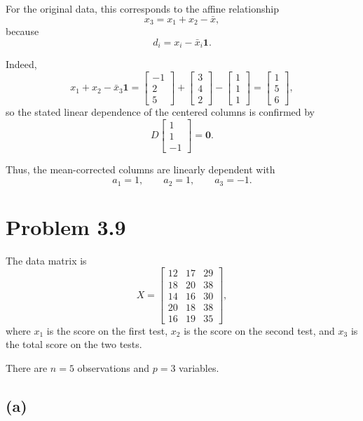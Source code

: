 \documentclass[12pt]{article}
\begin{document}
	For the original data, this corresponds to the affine
	relationship
	\[
	x_3=x_1+x_2-\bar{x},
	\]
	because
	\[
	d_i=x_i-\bar{x}_i\mathbf{1}.
	\]
	
	Indeed,
	\[
	x_1+x_2-\bar{x}_3\mathbf{1}
	=
	\begin{bmatrix}
		-1\\2\\5
	\end{bmatrix}
	+
	\begin{bmatrix}
		3\\4\\2
	\end{bmatrix}
	-
	\begin{bmatrix}
		1\\1\\1
	\end{bmatrix}
	=
	\begin{bmatrix}
		1\\5\\6
	\end{bmatrix},
	\]
	so the stated linear dependence of the centered columns is
	confirmed by
	\[
	D
	\begin{bmatrix}
		1\\1\\-1
	\end{bmatrix}
	=
	\mathbf{0}.
	\]
	
	Thus, the mean-corrected columns are linearly dependent with
	\[
	\boxed{
		a_1=1,\qquad
		a_2=1,\qquad
		a_3=-1}.
	\]
	
	\section*{Problem 3.9}
	
	The data matrix is
	\[
	X=
	\begin{bmatrix}
		12&17&29\\
		18&20&38\\
		14&16&30\\
		20&18&38\\
		16&19&35
	\end{bmatrix},
	\]
	where \(x_1\) is the score on the first test, \(x_2\) is the
	score on the second test, and \(x_3\) is the total score on the
	two tests.
	
	There are \(n=5\) observations and \(p=3\) variables.
	
	\subsection*{(a)}
	
\end{document}

